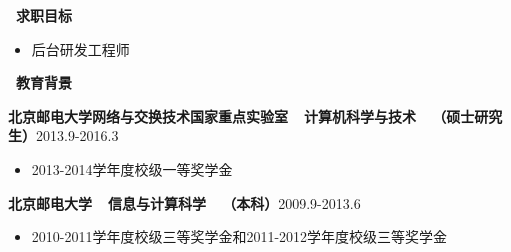 ﻿\documentclass[UTF8, winfonts]{ctexart}
\begin{document}
\noindent \textbf{ \heiti \faSearch\ 求职目标}
\begin{itemize}[topsep=0.3em]
  \item {}后台研发工程师
\end{itemize}
\noindent \textbf{ \heiti \faGraduationCap\ 教育背景}\par
\vspace{1.3ex}
\indent \textbf{北京邮电大学网络与交换技术国家重点实验室~~计算机科学与技术~~（硕士研究生）}\hfill {}2013.9-2016.3
\begin{itemize}
  \item {}2013-2014学年度校级一等奖学金
\end{itemize}\par
\indent \textbf{北京邮电大学~~信息与计算科学~~（本科）}\hfill {}2009.9-2013.6
\begin{itemize}
  \item {}2010-2011学年度校级三等奖学金和2011-2012学年度校级三等奖学金
\end{itemize}
\end{document}
